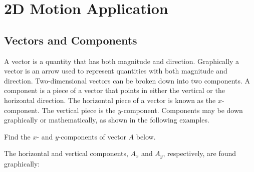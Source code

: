 \documentclass[main.tex]{subfiles}
\begin{document}
\section{2D Motion Application}

\subsection{Vectors and Components}

A \gls{vector} is a quantity that has both magnitude and direction. Graphically a vector is an arrow used to represent quantities with both magnitude and direction. Two-dimensional vectors can be broken down into two components. A \gls{component} is a piece of a vector that points in either the vertical or the horizontal direction. The horizontal piece of a vector is known as the $x$-component. The vertical piece is the $y$-component. Components may be down graphically or mathematically, as shown in the following examples.

\begin{example}
    Find the $x$- and $y$-components of vector $A$ below.
\end{example}

\begin{center}
\def\Ax{6}
\def\Ay{4}
\end{center}

\clearpage
\Solution The horizontal and vertical components, $A_x$ and $A_y$, respectively, are found graphically:

\begin{center}
\def\Ax{6}
\def\Ay{4}
\end{center}
\end{document}
